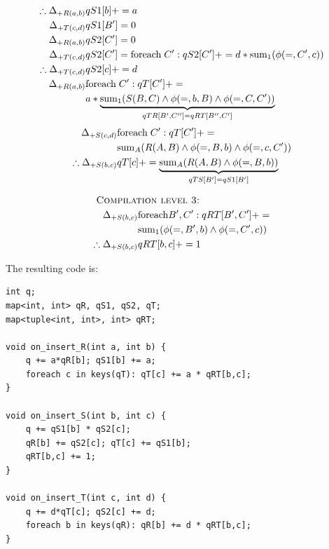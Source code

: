 \begin{example}
\vspace{-7mm}
\begin{align*}
\therefore \Delta_{+R(a,b)} & qS1[b] += a\\
\Delta_{+T(c,d)} & qS1[B'] = 0 \\
\Delta_{+R(a,b)} & qS2[C'] = 0 \\
\Delta_{+T(c,d)} & qS2[C'] = \mathrm{foreach} \; C': qS2[C'] +=
d * \mathrm{sum}_{1}(\phi(=,C',c))
\\
\therefore \Delta_{+T(c,d)} & qS2[c] += d\\
\Delta_{+R(a,b)} & \mathrm{foreach} \; C': qT[C'] += \\
& a * \underbrace{\mathrm{sum}_{1}(S(B,C) \wedge \phi(=,b,B) \wedge
  \phi(=,C,C'))}_{qTR[B',C''] = qRT[B'',C']}
\end{align*}
\begin{align*}
\Delta_{+S(c,d)} & \mathrm{foreach} \; C': qT[C'] += \\
& \mathrm{sum}_{A}(R(A,B) \wedge \phi(=,B,b) \wedge \phi(=,c,C'))\\
\therefore \Delta_{+S(b,c)} & qT[c] +=
\underbrace{\mathrm{sum}_{A}(R(A,B) \wedge \phi(=,B,b))}_{qTS[B'] = qS1[B']}
\end{align*}

\vspace{-3mm}
\begin{align*}
& \hspace{-1.5cm}\mbox{\sc Compilation level 3:}\\
\Delta_{+S(b,c)} & \algforeach B',C': qRT[B',C'] += \\
& \algsum_{1}(\phi(=,B',b) \wedge \phi(=,C',c))
\\
\therefore \Delta_{+S(b,c)} & qRT[b,c] += 1
\end{align*}
\end{example}

\noindent The resulting code is:

\begin{Verbatim}
int q;
map<int, int> qR, qS1, qS2, qT;
map<tuple<int, int>, int> qRT;

void on_insert_R(int a, int b) {
    q += a*qR[b]; qS1[b] += a;
    foreach c in keys(qT): qT[c] += a * qRT[b,c];
}

void on_insert_S(int b, int c) {
    q += qS1[b] * qS2[c];
    qR[b] += qS2[c]; qT[c] += qS1[b];
    qRT[b,c] += 1;
}

void on_insert_T(int c, int d) {
    q += d*qT[c]; qS2[c] += d;
    foreach b in keys(qR): qR[b] += d * qRT[b,c];
}
\end{Verbatim}

